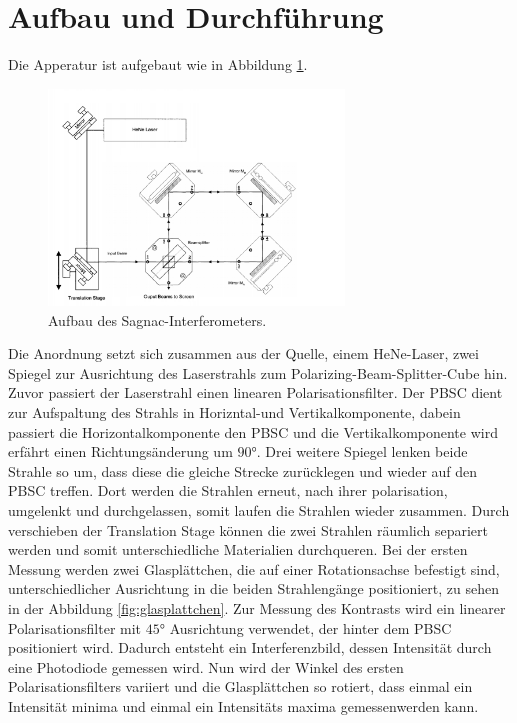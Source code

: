 \section{Aufbau und Durchführung}
\label{sec:Durchführung}
Die  Apperatur ist aufgebaut wie in Abbildung \ref{fig:apparat}.
\begin{figure}
    \centering
    \includegraphics[width=0.7\textwidth]{Apparatur.PNG}
    \caption{Aufbau des Sagnac-Interferometers.\cite{skript}}
    \label{fig:apparat}
\end{figure}
Die Anordnung setzt sich zusammen aus der Quelle, einem HeNe-Laser, zwei
Spiegel zur Ausrichtung des Laserstrahls zum Polarizing-Beam-Splitter-Cube hin.
Zuvor passiert der Laserstrahl einen linearen Polarisationsfilter.
Der PBSC dient zur Aufspaltung des Strahls in Horizntal-und Vertikalkomponente,
dabein passiert die Horizontalkomponente den PBSC und die Vertikalkomponente wird
erfährt einen Richtungsänderung um $90\si{\degree}$. Drei weitere Spiegel lenken
beide Strahle so um, dass diese die gleiche Strecke zurücklegen und wieder auf
den PBSC treffen. Dort werden die Strahlen erneut, nach ihrer polarisation,
umgelenkt und durchgelassen, somit laufen die Strahlen wieder zusammen.
Durch verschieben der Translation Stage können die zwei Strahlen räumlich separiert
werden und somit unterschiedliche Materialien durchqueren.
Bei der ersten Messung werden zwei Glasplättchen, die auf einer Rotationsachse
befestigt sind, unterschiedlicher
Ausrichtung in die beiden Strahlengänge positioniert, zu sehen in der Abbildung
\ref{fig:glasplattchen}.
Zur Messung des Kontrasts wird ein linearer Polarisationsfilter mit $45\si{\degree}$
Ausrichtung verwendet, der hinter dem PBSC positioniert wird.
Dadurch entsteht ein Interferenzbild, dessen Intensität durch eine Photodiode gemessen wird.
Nun wird der Winkel des ersten Polarisationsfilters variiert
und die Glasplättchen so rotiert, dass einmal ein Intensität minima und einmal
ein Intensitäts maxima gemessenwerden kann.

